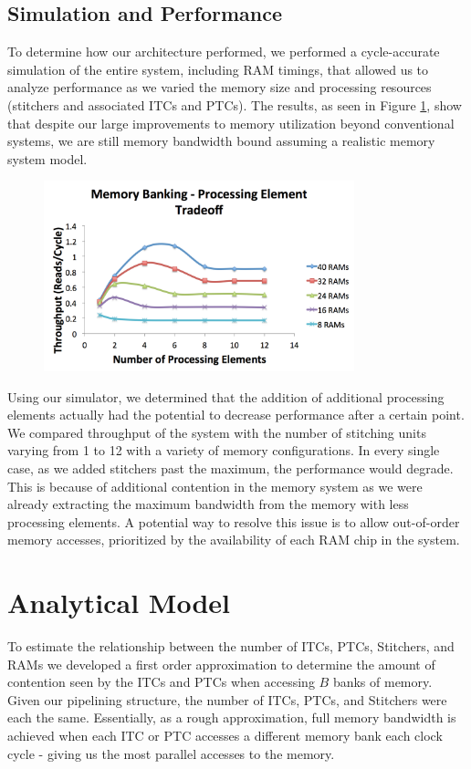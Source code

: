 \documentclass[11pt]{article}
\begin{document}
\subsection{Simulation and Performance}
To determine how our architecture performed, we performed a cycle-accurate simulation of the entire system, including RAM timings, that allowed us to analyze performance as we varied the memory size and processing resources (stitchers and associated ITCs and PTCs).  The results, as seen in Figure \ref{utilization}, show that despite our large improvements to memory utilization beyond conventional systems, we are still memory bandwidth bound assuming a realistic memory system model.  
\begin{figure}[ht!]
\centering
\includegraphics[width=90mm]{memproc.png}
\caption{}
\label{utilization}
\end{figure}

Using our simulator, we determined that the addition of additional processing elements actually had the potential to decrease performance after a certain point.  We compared throughput of the system with the number of stitching units varying from 1 to 12 with a variety of memory configurations.  In every single case, as we added stitchers past the maximum, the performance would degrade.  This is because of additional contention in the memory system as we were already extracting the maximum bandwidth from the memory with less processing elements.  A potential way to resolve this issue is to allow out-of-order memory accesses, prioritized by the availability of each RAM chip in the system.  

\section{Analytical Model}
 
To estimate the relationship between the number of ITCs, PTCs, Stitchers, and RAMs we developed a first order approximation to determine the amount of contention seen by the ITCs and PTCs when accessing $B$ banks of memory. Given our pipelining structure, the number of ITCs, PTCs, and Stitchers were each the same. Essentially, as a rough approximation, full memory bandwidth is achieved when each ITC or PTC accesses a different memory bank each clock cycle - giving us the most parallel accesses to the memory.
 
\end{document}
